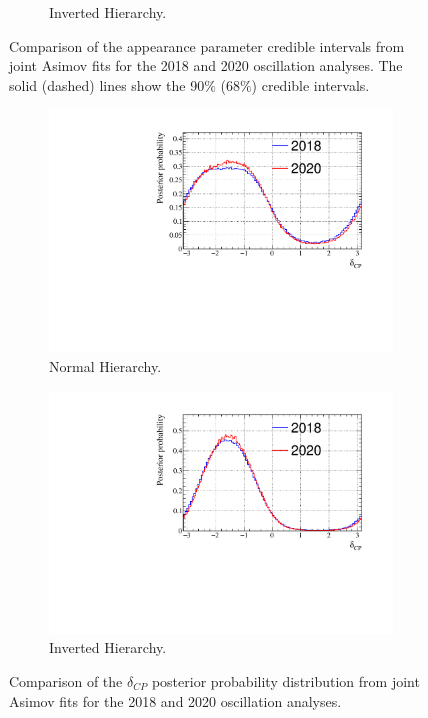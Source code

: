 \begin{figure}[!htbp]
\begin{subfigure}{.7\textwidth}
  \caption{Inverted Hierarchy.}
  \label{fig:20182020AppIH}
\end{subfigure}
\caption{Comparison of the appearance parameter credible intervals from joint Asimov fits for the 2018 and 2020 oscillation analyses. The solid (dashed) lines show the 90$\%$ ($68\%$) credible intervals.}
\label{fig:20182020App}
\end{figure}

\begin{figure}[!htbp]
\centering
\begin{subfigure}{.7\textwidth}
  \centering
  \includegraphics[width=0.95\linewidth]{figs/compMaCh3Contours_20182020/compMaCh3Contours_20182020_woRC_dcp_data_NH}
  \caption{Normal Hierarchy.}
  \label{fig:20182020dcpNH}
\end{subfigure}
\begin{subfigure}{.7\textwidth}
  \centering
  \includegraphics[width=0.95\linewidth]{figs/compMaCh3Contours_20182020/compMaCh3Contours_20182020_woRC_dcp_data_IH}
  \caption{Inverted Hierarchy.}
  \label{fig:20182020dcpIH}
\end{subfigure}
\caption{Comparison of the $\delta_{CP}$ posterior probability distribution from joint Asimov fits for the 2018 and 2020 oscillation analyses.}
\label{fig:20182020dcp}
\end{figure}

